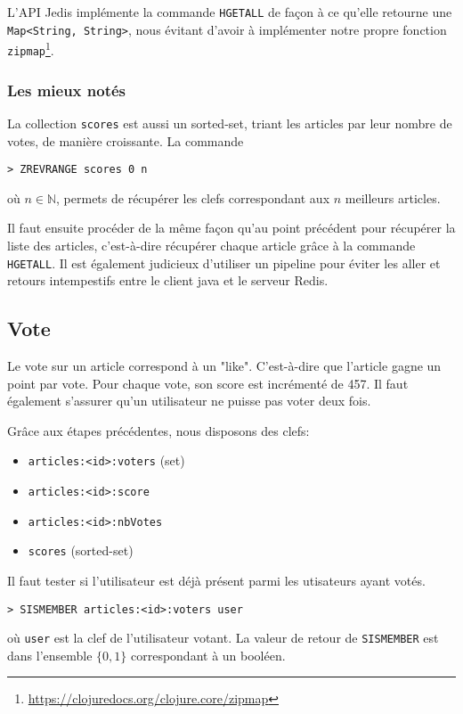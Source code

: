 \documentclass[article,a4paper,12pt]{article}
\begin{document}
L'API Jedis implémente la commande \texttt{HGETALL} de façon à ce qu'elle retourne
une \texttt{Map<String, String>}, nous évitant d'avoir à implémenter notre propre
fonction \texttt{zipmap}\footnote{\url{https://clojuredocs.org/clojure.core/zipmap}}.


\subsubsection{Les mieux notés}
\label{sec:orgheadline7}

La collection \texttt{scores} est aussi un sorted-set, triant les articles par leur
nombre de votes, de manière croissante. La commande
\begin{verbatim}
> ZREVRANGE scores 0 n
\end{verbatim}
où \(n \in \mathbb{N}\), permets de récupérer les clefs correspondant aux \(n\)
meilleurs articles.

Il faut ensuite procéder de la même façon qu'au point précédent pour récupérer
la liste des articles, c'est-à-dire récupérer chaque article grâce à la
commande \texttt{HGETALL}. Il est également judicieux d'utiliser un pipeline pour
éviter les aller et retours intempestifs entre le client java et le serveur
Redis.

\subsection{Vote}
\label{sec:orgheadline9}
Le vote sur un article correspond à un "like". C'est-à-dire que l'article
gagne un point par vote. Pour chaque vote, son score est incrémenté de 457.
Il faut également s'assurer qu'un utilisateur ne puisse pas voter deux fois.

Grâce aux étapes précédentes, nous disposons des clefs:

\begin{itemize}
\item \texttt{articles:<id>:voters} (set)
\item \texttt{articles:<id>:score}
\item \texttt{articles:<id>:nbVotes}
\item \texttt{scores} (sorted-set)
\end{itemize}

Il faut tester si l'utilisateur est déjà présent parmi les utisateurs ayant votés.

\begin{verbatim}
> SISMEMBER articles:<id>:voters user
\end{verbatim}
où \texttt{user} est la clef de l'utilisateur votant. La valeur de retour de
\texttt{SISMEMBER} est dans l'ensemble \(\{0,1\}\) correspondant à un booléen.
\end{document}
